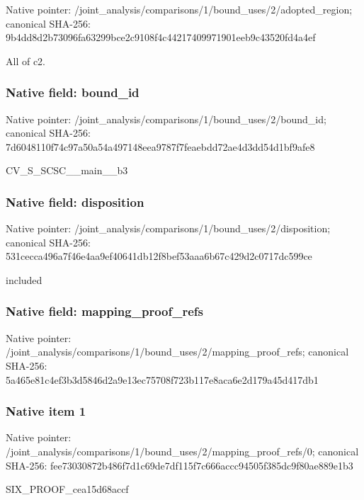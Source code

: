 \documentclass[10pt,a4paper]{article}
\begin{document}
Native pointer: /joint\_analysis/comparis\allowbreak{}ons/1/bound\_uses/2/adopt\allowbreak{}ed\_region; canonical SHA-256: 9b4dd8d2b73096fa63299bce\allowbreak{}2c9108f4c44217409971901e\allowbreak{}eb9c43520fd4a4ef


All of c2.


\subsubsection{Native field: bound\_id}


Native pointer: /joint\_analysis/comparis\allowbreak{}ons/1/bound\_uses/2/bound\allowbreak{}\_id; canonical SHA-256: 7d6048110f74c97a50a54a49\allowbreak{}7148eea9787f7feaebdd72ae\allowbreak{}4d3dd54d1bf9afe8


CV\_S\_SCSC\_\_main\_\_b3


\subsubsection{Native field: disposition}


Native pointer: /joint\_analysis/comparis\allowbreak{}ons/1/bound\_uses/2/dispo\allowbreak{}sition; canonical SHA-256: 531cecca496a7f46e4aa9ef4\allowbreak{}0641db12f8bef53aaa6b67c4\allowbreak{}29d2c0717dc599ce


included


\subsubsection{Native field: mapping\_proof\_refs}


Native pointer: /joint\_analysis/comparis\allowbreak{}ons/1/bound\_uses/2/mappi\allowbreak{}ng\_proof\_refs; canonical SHA-256: 5a465e81c4ef3b3d5846d2a9\allowbreak{}e13ec75708f723b117e8aca6\allowbreak{}e2d179a45d417db1



\subsubsection{Native item 1}


Native pointer: /joint\_analysis/comparis\allowbreak{}ons/1/bound\_uses/2/mappi\allowbreak{}ng\_proof\_refs/0; canonical SHA-256: fee73030872b486f7d1c69de\allowbreak{}7df115f7c666accc94505f38\allowbreak{}5dc9f80ae889e1b3


SIX\_PROOF\_cea15d68accf
\end{document}
